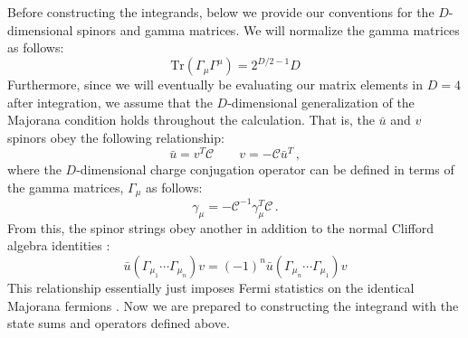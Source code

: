 \documentclass[12pt,letter]{article}
\def\be{\begin{equation}}
\def\ee{\end{equation}}
\begin{document}
Before constructing the integrands, below we provide our conventions for the $D$-dimensional spinors and gamma matrices. We will normalize the gamma matrices as follows:
\begin{equation}
\text{Tr}(\Gamma_\mu\Gamma^\mu) = 2^{D/2-1}D
\end{equation}
Furthermore, since we will eventually be evaluating our matrix elements in $D=4$ after integration, we assume that the $D$-dimensional generalization of the Majorana condition holds throughout the calculation. That is, the $\bar{u}$ and $v$ spinors obey the following relationship:
\be
\bar{u} = v^T \mathcal{C} \qquad v = - \mathcal{C} \bar{u}^T\,,
\ee
where the $D$-dimensional charge conjugation operator can be defined in terms of the gamma matrices, $\Gamma_\mu$ as follows:
\be
\gamma_\mu = - \mathcal{C} ^{-1}\gamma_\mu ^T \mathcal{C}\,.
\ee
From this, the spinor strings obey another in addition to the normal Clifford algebra identities \cite{Chiodaroli2013upa}:
\be
\bar{u}(\Gamma_{\mu_1} \cdots \Gamma_{\mu _n}) v =(-1)^n \bar{u} (\Gamma_{\mu_n} \cdots \Gamma_{\mu _1} )v
\ee
This relationship essentially just imposes Fermi statistics on the identical Majorana fermions \cite{Carrasco:2023vjg}. Now we are prepared to constructing the integrand with the state sums and operators defined above. 
\end{document}
